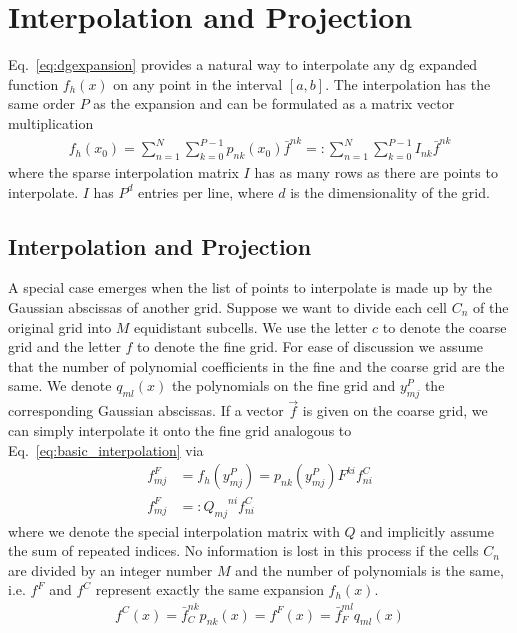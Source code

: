 \section{Interpolation and Projection}
Eq.~\eqref{eq:dgexpansion} provides a natural way to interpolate any
dg expanded function $f_h(x)$ on any point in the interval $[a,b]$. 
The interpolation has the same order $P$ as the expansion and 
can be formulated as a matrix vector multiplication
\begin{align}
f_h(x_0) = \sum_{n=1}^N\sum_{k=0}^{P-1} p_{nk}(x_0) \bar f^{nk} =: \sum_{n=1}^N\sum_{k=0}^{P-1}I_{nk} \bar f^{nk}
\label{eq:basic_interpolation}
\end{align}
where the sparse interpolation matrix $I$ has as many rows as there are 
points to interpolate. $I$ has $P^d$ entries per line, where $d$ is the dimensionality of the grid. 


\subsection{Interpolation and Projection}
A special case emerges when the list of points to interpolate is made up
by the Gaussian abscissas of another grid. 
Suppose we want to divide each cell $C_n$ of the original grid into $M$ equidistant subcells.
We use the letter $c$ to denote the coarse grid and the letter $f$ to denote
the fine grid. 
For ease of discussion we assume that the number of polynomial coefficients
in the fine and the coarse grid are the same. 
We denote $q_{ml}(x)$ the polynomials on the fine grid and $y^P_{mj}$ the 
corresponding Gaussian abscissas. 
If a vector $\vec f$ is given on the coarse grid, we can simply interpolate
it onto the fine grid analogous to Eq.~\eqref{eq:basic_interpolation} via
\begin{subequations}
\begin{align}
  f^F_{mj} &= f_h(y^P_{mj}) = p_{nk}(y^P_{mj})F^{ki} f^C_{ni} \\
  f^F_{mj} &=: {Q_{mj}}^{ni} f^C_{ni}
  \label{eq:interpolation}
\end{align}
\end{subequations}
where we denote the special interpolation matrix with $Q$ and implicitly assume the sum of repeated indices.
No information is lost in this process if the cells $C_n$ are divided by an 
integer number $M$ and the number of polynomials is the same, i.e. 
$f^F$ and $f^C$ represent exactly the same expansion $f_h(x)$. 
\begin{align}
  f^C(x) = \bar f_C^{nk}p_{nk}(x) = f^F(x) = \bar f_F^{ml}q_{ml}(x) 
  \label{eq:no_loss}
\end{align}

